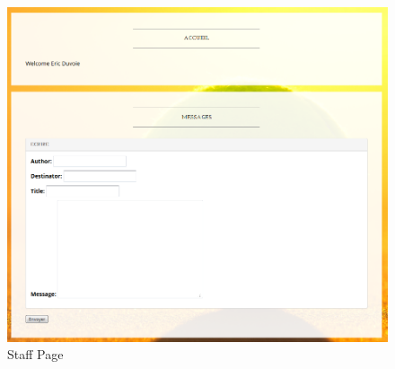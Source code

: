 \documentclass[a4paper, 12pt]{article}
\begin{document}
\begin{appendices}
\begin{figure}
\caption{\label{figure6} Staff Page}
\includegraphics[scale=0.7]{site5.PNG}
\end{figure}

\end{appendices}
\end{document}
